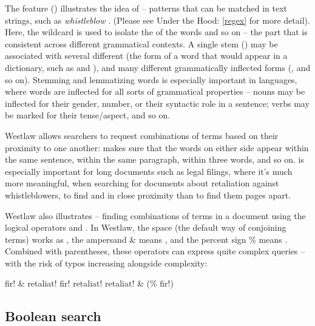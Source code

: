 The  feature () illustrates the idea of  -- patterns that can be matched in text strings, such as  \emph{whistleblow} .  (Please see Under the Hood: \ref{regex} for more detail).  Here, the wildcard is used to isolate the  of the words  and so on -- the part that is consistent across different grammatical contexts.  A single stem () may be associated with several different   (the form of a word that would appear in a dictionary, such as  and ), and many different grammatically inflected forms (, and so on).  Stemming and lemmatizing words is especially important in  languages, where words are inflected for all sorts of grammatical properties -- nouns may be inflected for their gender, number, or their syntactic role in a sentence; verbs may be marked for their tense/aspect, and so on.  

Westlaw allows searchers to request combinations of terms based on their proximity to one another:  makes sure that the words on either side appear within the same sentence,  within the same paragraph,  within three words, and so on.   is especially important for long documents such as legal filings, where it's much more meaningful, when searching for documents about retaliation against whistleblowers, to find  and  in close proximity than to find them pages apart.

Westlaw also illustrates  -- finding combinations of terms in a document using the logical operators  and .  In Westlaw, the space (the default way of conjoining terms) works as , the ampersand \& means , and the percent sign \% means .  Combined with parentheses, these operators can express quite complex queries -- with the risk of typos increasing alongside complexity: 

\ea    \ea  fir! \& retaliat!
	\ex fir! retaliat!
	\ex retaliat! \& (\% fir!)
\z 
\z 

\subsection{Boolean search}

